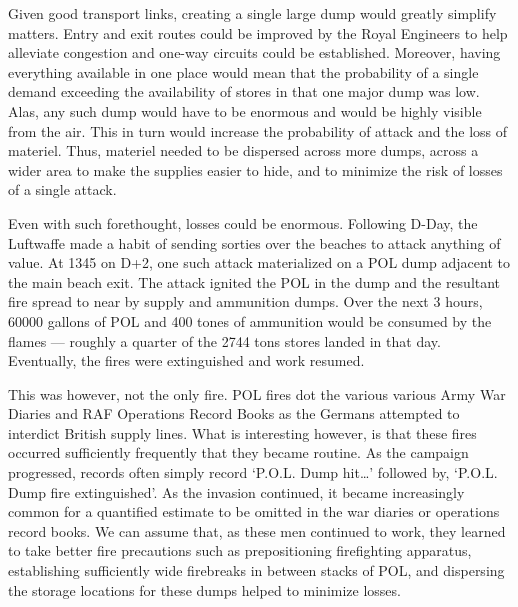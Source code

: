 \documentclass[noraggedright]{turabian-researchpaper}
\begin{document}

Given good transport links, creating a single large dump would greatly simplify
matters.  Entry and exit routes could be improved by the Royal Engineers to
help alleviate congestion and one-way circuits could be established.  Moreover,
having everything available in one place would mean that the probability of a
single demand exceeding the availability of stores in that one major dump was 
low.  Alas, any such dump would have to be enormous and would be highly 
visible from the air.  This in turn would increase the probability of attack 
and the loss of materiel.  Thus, materiel needed to be dispersed across more 
dumps, across a wider area to make the supplies easier to hide, and to 
minimize the risk of losses of a single attack.

Even with such forethought, losses could be enormous.  Following D-Day, the 
Luftwaffe made a habit of sending sorties over the beaches to attack anything 
of value.  At 1345 on D+2, one such attack materialized on a POL dump 
adjacent to the main beach exit.  The attack ignited the POL in the dump and 
the resultant fire spread to near by supply and ammunition dumps.  Over the 
next 3 hours, 60000 gallons of POL and 400 tones of ammunition would be 
consumed 
by the flames --- roughly a quarter of the 2744 tons stores landed in that
day.\autocite[8 June 1944]{1raf}  Eventually, the fires were extinguished
and work resumed.

This was however, not the only fire.  POL fires dot the various various Army 
War Diaries and RAF Operations Record Books as the Germans attempted to 
interdict British supply lines.  What is interesting however, is that these
fires occurred sufficiently frequently that they became routine.  As the 
campaign progressed, records often simply record `P.O.L. Dump hit\ldots' 
followed by, `P.O.L.  Dump fire extinguished'.\autocite[10 June 1944]
{1raf}  %
As the invasion continued, it became increasingly common for a 
quantified estimate to be omitted in the war diaries or operations record
books.  We can assume that, as these men continued to work, they learned to 
take better fire precautions such as prepositioning firefighting apparatus, 
establishing sufficiently wide firebreaks in between stacks of POL, and 
dispersing the storage locations for these dumps helped to minimize
losses.  
\end{document}
